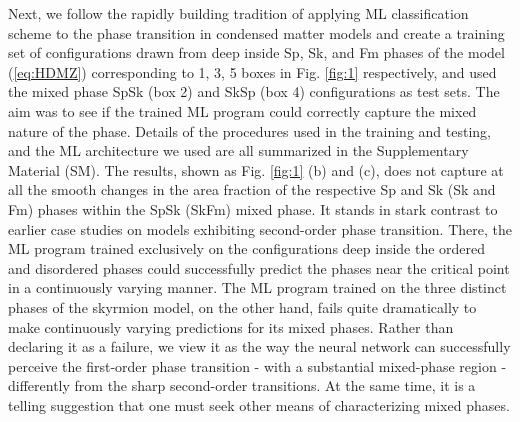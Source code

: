 \documentclass[reprint,amsmath,amssymb,aps,showpacs,superscriptaddress,prl]{revtex4-1}
\begin{document}
Next, we follow the rapidly building tradition of applying ML classification scheme to the phase transition in condensed matter models and create a training set of configurations drawn from deep inside Sp, Sk, and Fm phases of the model (\ref{eq:HDMZ}) corresponding to 1, 3, 5 boxes in Fig. \ref{fig:1} respectively, and used the mixed phase SpSk (box 2) and SkSp (box 4) configurations as test sets. The aim was to see if the trained ML program could correctly capture the mixed nature of the phase. Details of the procedures used in the training and testing, and the ML architecture we used are all summarized in the Supplementary Material (SM). The results, shown as Fig. \ref{fig:1} (b) and (c), does not capture at all the smooth changes in the area fraction of the respective Sp and Sk (Sk and Fm) phases within the SpSk (SkFm) mixed phase.
It stands in stark contrast to earlier case studies on models exhibiting second-order phase transition. There, the ML program trained exclusively on the configurations deep inside the ordered and disordered phases could successfully predict the phases near the critical point in a continuously varying manner\cite{wang16,melko17,tanaka17,scalettar17,wetzel17,kim18,zhai17,scalettar17,beach18}. The ML program trained on the three distinct phases of the skyrmion model, on the other hand, fails quite dramatically to make continuously varying predictions for its mixed phases. Rather than declaring it as a failure, we view it as the way the neural network can successfully perceive the first-order phase transition - with a substantial mixed-phase region - differently from the sharp second-order transitions. At the same time, it is a telling suggestion that one must seek other means of characterizing mixed phases.
\end{document}
